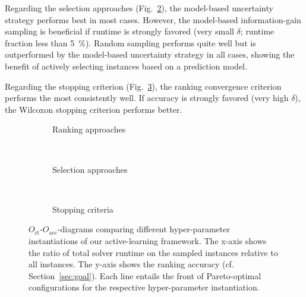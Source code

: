 \documentclass[runningheads]{llncs}
\begin{document}
Regarding the selection approaches (Fig.~\ref{fig:annitraincolorselection}), the model-based uncertainty strategy performs best in most cases.
However, the model-based information-gain sampling is beneficial if runtime is strongly favored (very small $\delta$; runtime fraction less than \SI{5}{\%}).
Random sampling performs quite well but is outperformed by the model-based uncertainty strategy in all cases, showing the benefit of actively selecting instances based on a prediction model.

Regarding the stopping criterion (Fig.~\ref{fig:annitraincolorstopping}), the ranking convergence criterion performs the most consistently well.
If accuracy is strongly favored (very high $\delta$), the Wilcoxon stopping criterion performs better.

\begin{figure}[tbp!]
  \centering
  \begin{subfigure}{1.0\textwidth}
    \caption{Ranking approaches}
    \label{fig:annitraincolorranking}
  \end{subfigure}
  \\
  \vspace{0.2cm}
  \begin{subfigure}{1.0\textwidth}
    \caption{Selection approaches}
    \label{fig:annitraincolorselection}
  \end{subfigure}
  \\
  \vspace{0.2cm}
  \begin{subfigure}{1.0\textwidth}
    \caption{Stopping criteria}
    \label{fig:annitraincolorstopping}
  \end{subfigure}

  \caption{
  	$O_{\operatorname{rt}}$-$O_{\operatorname{acc}}$-diagrams comparing different hyper-parameter instantiations of our active-learning framework.
  	The x-axis shows the ratio of total solver runtime on the sampled instances relative to all instances.
  	The y-axis shows the ranking accuracy (cf. Section~\ref{sec:goal}).
  	Each line entails the front of Pareto-optimal configurations for the respective hyper-parameter instantiation.
  }
  \label{fig:e2eallsolvers}
\end{figure}
\end{document}
